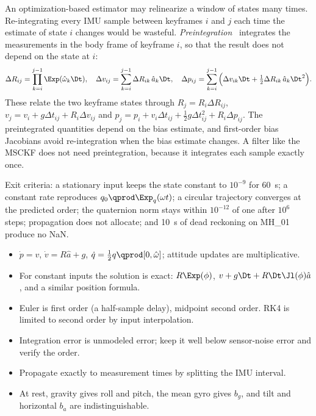 An optimization-based estimator may relinearize a window of states many times. Re-integrating every IMU
sample between keyframes $i$ and $j$ each time the estimate of state $i$ changes would be wasteful.
\emph{Preintegration}~\cite{lupton2012visual, forster2017preintegration} integrates the measurements in the body frame
of keyframe $i$, so that the result does not depend on the state at $i$:
\begin{equation}
  \Delta R_{ij} = \prod_{k=i}^{j-1}\Exp(\hat\omega_k\Dt), \quad
  \Delta v_{ij} = \sum_{k=i}^{j-1}\Delta R_{ik}\,\hat a_k\Dt, \quad
  \Delta p_{ij} = \sum_{k=i}^{j-1}\Big(\Delta v_{ik}\Dt + \tfrac12\Delta R_{ik}\,\hat a_k\Dt^2\Big).
\end{equation}
These relate the two keyframe states through
$R_j = R_i\Delta R_{ij}$, $v_j = v_i + g\Delta t_{ij} + R_i\Delta v_{ij}$ and
$p_j = p_i + v_i\Delta t_{ij} + \tfrac12g\Delta t_{ij}^2 + R_i\Delta p_{ij}$. The preintegrated quantities depend on the
bias estimate, and first-order bias Jacobians avoid re-integration when the bias estimate changes. A filter
like the MSCKF does not need preintegration, because it integrates each sample exactly once.

\begin{projectlink}[Milestone 4]
Exit criteria: a stationary input keeps the state constant to $10^{-9}$ for 60~s; a constant rate reproduces
$q_0\qprod\Exp_q(\omega t)$; a circular trajectory converges at the predicted order; the quaternion norm stays
within $10^{-12}$ of one after $10^6$ steps; propagation does not allocate; and 10~s of dead reckoning on
MH\_01 produce no NaN.
\end{projectlink}

\begin{takeaways}
\begin{itemize}
  \item $\dot p = v$, $\dot v = R\hat a + g$, $\dot q = \tfrac12 q\qprod[0,\hat\omega]$; attitude updates are multiplicative.
  \item For constant inputs the solution is exact: $R\Exp(\phi)$, $v + g\Dt + R\Dt\Jl(\phi)\hat a$, and a similar
        position formula.
  \item Euler is first order (a half-sample delay), midpoint second order. RK4 is limited to second order by
        input interpolation.
  \item Integration error is unmodeled error; keep it well below sensor-noise error and verify the order.
  \item Propagate exactly to measurement times by splitting the IMU interval.
  \item At rest, gravity gives roll and pitch, the mean gyro gives $b_g$, and tilt and horizontal $b_a$ are
        indistinguishable.
\end{itemize}
\end{takeaways}


